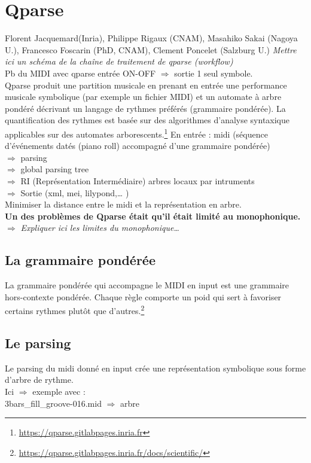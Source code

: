 \section{Qparse}
Florent Jacquemard(Inria), Philippe Rigaux (CNAM), Masahiko Sakai (Nagoya U.), Francesco Foscarin (PhD, CNAM), Clement Poncelet (Salzburg U.)
\textit{Mettre ici un schéma de la chaîne de traitement de qparse (workflow)}\\
Pb du MIDI avec qparse entrée ON-OFF $\Rightarrow$ sortie 1 seul symbole.\\
Qparse produit une partition musicale en prenant en entrée une performance musicale symbolique (par exemple un fichier MIDI) et un automate à arbre pondéré décrivant un langage de rythmes préférés (grammaire pondérée). La quantification des rythmes est basée sur des algorithmes d’analyse syntaxique applicables sur des automates arborescents.\footnote{\url{https://qparse.gitlabpages.inria.fr}}
En entrée : midi (séquence d’événements datés (piano roll) accompagné d’une grammaire pondérée)\\
$\Rightarrow$ parsing\\
$\Rightarrow$ global parsing tree\\
$\Rightarrow$ RI (Représentation Intermédiaire) arbres locaux par intruments\\
$\Rightarrow$ Sortie (xml, mei, lilypond,… )\\
Minimiser la distance entre le midi et la représentation en arbre.\\
\textbf{Un des problèmes de Qparse était qu’il était limité au monophonique.}
$\Rightarrow$ \textit{Expliquer ici les limites du monophonique…}
\subsection*{La grammaire pondérée}
La grammaire pondérée qui accompagne le MIDI en input est une grammaire hors-contexte pondérée. Chaque règle comporte un poid qui sert à favoriser certains rythmes plutôt que d’autres.\footnote{\url{https://qparse.gitlabpages.inria.fr/docs/scientific/}}
\subsection*{Le parsing}
Le parsing du midi donné en input crée une représentation symbolique sous forme d’arbre de rythme.\\
Ici $\Rightarrow$ exemple avec :\\
3bars\_fill\_groove-016.mid $\Rightarrow$ arbre\\
